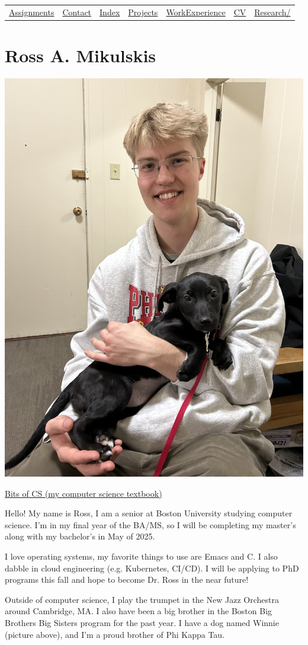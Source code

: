 \documentclass[11pt]{article}
\author{Ross}
\date{\today}
\title{}
\begin{document}
\begin{center}
\begin{tabular}{lllllll}
\href{assignments.html}{Assignments} & \href{contact.html}{Contact} & \href{index.html}{Index} & \href{projects.html}{Projects} & \href{work\_experience.html}{WorkExperience} & \href{cv/rossMikulskisResume.pdf}{CV} & \href{research/index.html}{Research/}\\
\end{tabular}
\end{center}
\section*{Ross A. Mikulskis}
\label{sec:org3af4158}

\begin{center}
\includegraphics[width=.9\linewidth]{./profile.jpg}
\end{center}

\href{https://bitsofcs.com/}{Bits of CS (my computer science textbook)}

Hello! My name is Ross, I am a senior at Boston University studying
computer science. I'm in my final year of the BA/MS, so I will be completing
my master's along with my bachelor's in May of 2025.

I love operating systems, my favorite things to use are Emacs and C. I also
dabble in cloud engineering (e.g. Kubernetes, CI/CD). I will be
applying to PhD programs this fall and hope to become Dr. Ross in the near future!

Outside of computer science, I play the trumpet in the New Jazz Orchestra
around Cambridge, MA. I also have been a big brother in the Boston Big Brothers
Big Sisters program for the past year. I have a dog named Winnie (picture above),
and I'm a proud brother of Phi Kappa Tau. 
\end{document}
